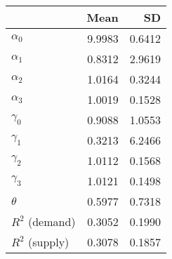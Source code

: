 
\begin{tabular}[t]{lrr}
\toprule
  & Mean & SD\\
\midrule
$\alpha_{0}$ & 9.9983 & 0.6412\\
$\alpha_{1}$ & 0.8312 & 2.9619\\
$\alpha_{2}$ & 1.0164 & 0.3244\\
$\alpha_{3}$ & 1.0019 & 0.1528\\
$\gamma_{0}$ & 0.9088 & 1.0553\\
$\gamma_{1}$ & 0.3213 & 6.2466\\
$\gamma_{2}$ & 1.0112 & 0.1568\\
$\gamma_{3}$ & 1.0121 & 0.1498\\
$\theta$ & 0.5977 & 0.7318\\
$R^{2}$ (demand) & 0.3052 & 0.1990\\
$R^{2}$ (supply) & 0.3078 & 0.1857\\
\bottomrule
\end{tabular}
